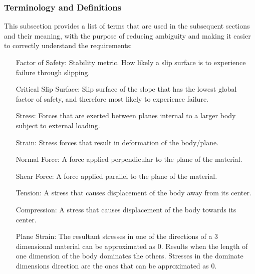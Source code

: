 \documentclass[12pt]{article}
\begin{document}
\subsubsection{Terminology and Definitions}
\label{Sec:TaD}
This subsection provides a list of terms that are used in the subsequent sections and their meaning, with the purpose of reducing ambiguity and making it easier to correctly understand the requirements:
\begin{itemize}
\item[Factor of Safety:]Stability metric. How likely a slip surface is to experience failure through slipping.
\item[Critical Slip Surface:]Slip surface of the slope that has the lowest global factor of safety, and therefore most likely to experience failure.
\item[Stress:]Forces that are exerted between planes internal to a larger body subject to external loading.
\item[Strain:]Stress forces that result in deformation of the body/plane.
\item[Normal Force:]A force applied perpendicular to the plane of the material.
\item[Shear Force:]A force applied parallel to the plane of the material.
\item[Tension:]A stress that causes displacement of the body away from its center.
\item[Compression:]A stress that causes displacement of the body towards its center.
\item[Plane Strain:]The resultant stresses in one of the directions of a 3 dimensional material can be approximated as 0. Results when the length of one dimension of the body dominates the others. Stresses in the dominate dimensions direction are the ones that can be approximated as 0.
\end{itemize}
\end{document}
